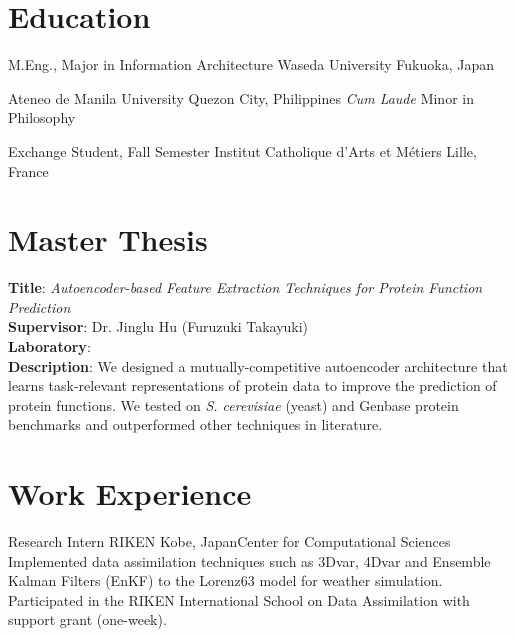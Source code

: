 \documentclass[12pt,a4paper,sans]{moderncv}
\begin{document}
\maketitle


\section{Education}
        {M.Eng., Major in Information Architecture}
        {Waseda University}
        {Fukuoka, Japan}{}
        {}

        {Ateneo de Manila University}
        {Quezon City, Philippines}
        {\textit{Cum Laude}}
        {Minor in Philosophy}

        {Exchange Student, Fall Semester}
        {Institut Catholique d'Arts et M\'etiers}
        {Lille, France}{}
        {}

\section{Master Thesis}
\textbf{Title}: \emph{Autoencoder-based Feature Extraction Techniques for Protein Function Prediction}\\
\textbf{Supervisor}: Dr. Jinglu Hu (Furuzuki Takayuki)\\
\textbf{Laboratory}: {\color{blue}}\\
\textbf{Description}: We designed a mutually-competitive autoencoder architecture that learns
task-relevant representations of protein data to improve the prediction of protein functions.
We tested on \textit{S. cerevisiae} (yeast) and Genbase protein benchmarks and outperformed other
techniques in literature.

\section{Work Experience}

        {Research Intern}
        {RIKEN}
        {Kobe, Japan}{Center for Computational Sciences}
        {
        Implemented data assimilation techniques such as 3Dvar,
        4Dvar and Ensemble Kalman Filters (EnKF) to the Lorenz63 model
        for weather simulation. Participated in the RIKEN International
        School on Data Assimilation with support grant (one-week).
        }
\end{document}
